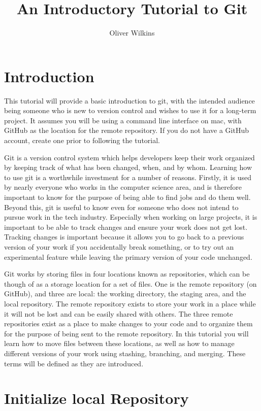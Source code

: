 \documentclass[10pt,twocolumn]{article}
\title{An Introductory Tutorial to Git}
\author{Oliver Wilkins}
\affiliation{Occidental College}
\begin{document}
\maketitle

\section{Introduction}

This tutorial will provide a basic introduction to git, with the intended audience being someone who is new to version control and wishes to use it for a long-term project. It assumes you will be using a command line interface on mac, with GitHub as the location for the remote repository. If you do not have a GitHub account, create one prior to following the tutorial. 

Git is a version control system which helps developers keep their work organized by keeping track of what has been changed, when, and by whom. Learning how to use git is a worthwhile investment for a number of reasons. Firstly, it is used by nearly everyone who works in the computer science area, and is therefore important to know for the purpose of being able to find jobs and do them well. Beyond this, git is useful to know even for someone who does not intend to pursue work in the tech industry. Especially when working on large projects, it is important to be able to track changes and ensure your work does not get lost. Tracking changes is important because it allows you to go back to a previous version of your work if you accidentally break something, or to try out an experimental feature while leaving the primary version of your code unchanged. 

Git works by storing files in four locations known as repositories, which can be though of as a storage location for a set of files. One is the remote repository (on GitHub), and three are local: the working directory, the staging area, and the local repository. The remote repository exists to store your work in a place while it will not be lost and can be easily shared with others. The three remote repositories exist as a place to make changes to your code and to organize them for the purpose of being sent to the remote repository. In this tutorial you will learn how to move files between these locations, as well as how to manage different versions of your work using stashing, branching, and merging. These terms will be defined as they are introduced. 


\section{Initialize local Repository}
\end{document}
